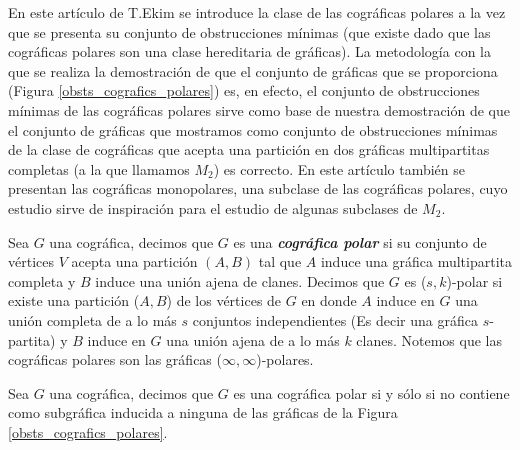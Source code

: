 En este artículo de T.Ekim \cite{Ekim} se introduce la clase de las cográficas polares a la vez que se presenta su conjunto de obstrucciones mínimas (que existe dado que las cográficas polares son una clase hereditaria de gráficas). La metodología con la que se realiza la demostración de que el conjunto de gráficas que se proporciona (Figura \ref{obsts_cografics_polares}) es, en efecto, el conjunto de obstrucciones mínimas de las cográficas polares sirve como base de nuestra demostración de que el conjunto de gráficas que mostramos como conjunto de obstrucciones mínimas de la clase de cográficas que acepta una partición en dos gráficas multipartitas completas (a la que llamamos $M_2$) es correcto. En este artículo también se presentan las cográficas monopolares, una subclase de las cográficas polares, cuyo estudio sirve de inspiración para el estudio de algunas subclases de $M_2$.

Sea $G$ una cográfica, decimos que $G$ es una \emph{\textbf{cográfica polar}} si su conjunto de vértices $V$ acepta una partición $(A,B)$ tal que $A$ induce una gráfica multipartita completa y $B$ induce una unión ajena de clanes.
Decimos que $G$ es ($s,k$)-polar si existe una partición ($A,B$) de los vértices de $G$ en donde $A$ induce en $G$ una unión completa de a lo más $s$ conjuntos independientes (Es decir una gráfica $s$-partita) y $B$ induce en $G$ una unión ajena de a lo más $k$ clanes. Notemos que las cográficas polares son las gráficas ($\infty, \infty$)-polares.

\begin{theorem}
    Sea $G$ una cográfica, decimos que $G$ es una cográfica polar si y sólo si no contiene como subgráfica inducida a ninguna de las gráficas de la Figura \ref{obsts_cografics_polares}.
\end{theorem}

